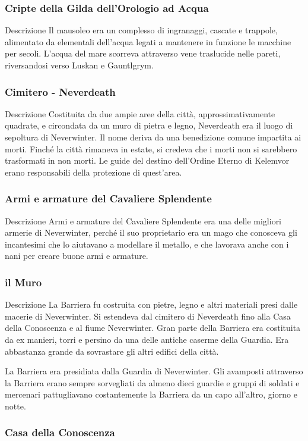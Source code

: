 \documentclass{article}
\begin{document}
\subsubsection{Cripte della Gilda dell'Orologio ad Acqua}
Descrizione
Il mausoleo era un complesso di ingranaggi, cascate e trappole, alimentato da elementali dell'acqua legati a mantenere in funzione le macchine per secoli. L'acqua del mare scorreva attraverso vene traslucide nelle pareti, riversandosi verso Luskan e Gauntlgrym.
\subsubsection{Cimitero - Neverdeath}
Descrizione
Costituita da due ampie aree della città, approssimativamente quadrate, e circondata da un muro di pietra e legno, Neverdeath era il luogo di sepoltura di Neverwinter. Il nome deriva da una benedizione comune impartita ai morti. Finché la città rimaneva in estate, si credeva che i morti non si sarebbero trasformati in non morti.
Le guide del destino dell'Ordine Eterno di Kelemvor erano responsabili della protezione di quest'area.
\subsubsection{Armi e armature del Cavaliere Splendente}
Descrizione
Armi e armature del Cavaliere Splendente era una delle migliori armerie di Neverwinter, perché il suo proprietario era un mago che conosceva gli incantesimi che lo aiutavano a modellare il metallo, e che lavorava anche con i nani per creare buone armi e armature.
\subsubsection{il Muro}
Descrizione
La Barriera fu costruita con pietre, legno e altri materiali presi dalle macerie di Neverwinter. Si estendeva dal cimitero di Neverdeath fino alla Casa della Conoscenza e al fiume Neverwinter. Gran parte della Barriera era costituita da ex manieri, torri e persino da una delle antiche caserme della Guardia. Era abbastanza grande da sovrastare gli altri edifici della città.

La Barriera era presidiata dalla Guardia di Neverwinter. Gli avamposti attraverso la Barriera erano sempre sorvegliati da almeno dieci guardie e gruppi di soldati e mercenari pattugliavano costantemente la Barriera da un capo all'altro, giorno e notte.

\subsubsection{Casa della Conoscenza}
\end{document}
